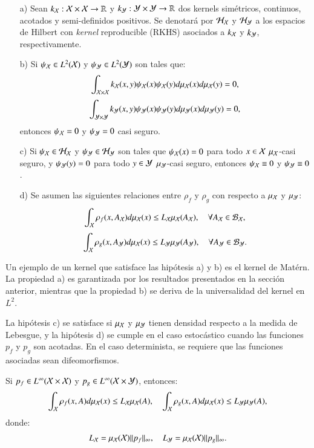 \begin{enumerate}
    \item[a)] Sean $k_{\mathcal{X}}:\mathcal{X} \times \mathcal{X} \to \mathbb{R}$ y $k_{\mathcal{Y}}: \mathcal{Y} \times \mathcal{Y} \to \mathbb{R}$ dos kernels simétricos, continuos, acotados y semi-definidos positivos. Se denotará por $\mathcal{H}_{\mathcal{X}}$ y $\mathcal{H}_{\mathcal{Y}}$ a los espacios de Hilbert con \textit{kernel} reproducible (RKHS) asociados a $k_{\mathcal{X}}$ y $k_{\mathcal{Y}}$, respectivamente.
    \item[b)] Si $\psi_{\mathcal{X}} \in L^2(\mathcal{X})$ y $\psi_{\mathcal{Y}} \in L^2(\mathcal{Y})$ son tales que: 
    \[
        \int_{\mathcal{X} \times \mathcal{X}} k_{\mathcal{X}}(x,y) \psi_{\mathcal{X}} (x) \psi_{\mathcal{X}} (y) d \mu_{\mathcal{X}} (x) d \mu_{\mathcal{X}} (y) = 0, 
    \]
    \[
        \int_{\mathcal{Y} \times \mathcal{Y}} k_{\mathcal{Y}}(x,y) \psi_{\mathcal{Y}} (x) \psi_{\mathcal{Y}} (y) d \mu_{\mathcal{Y}} (x) d \mu_{\mathcal{Y}} (y) = 0, 
    \]
    entonces $\psi_{\mathcal{X}} = 0$ y $\psi_{\mathcal{Y}} = 0$ casi seguro.
    \item[c)] Si $\psi_{\mathcal{X}} \in \mathcal{H}_{\mathcal{X}}$ y $\psi_{\mathcal{Y}} \in \mathcal{H}_{\mathcal{Y}}$ son tales que $\psi_{\mathcal{X}}(x) = 0$ para todo $x \in \mathcal{X}$ $\mu_{\mathcal{X}}$-casi seguro, y $\psi_{\mathcal{Y}}(y) = 0$ para todo $y \in \mathcal{Y}$ $\mu_{\mathcal{Y}}$-casi seguro, entonces $\psi_{\mathcal{X}} \equiv 0$ y $\psi_{\mathcal{Y}} \equiv 0$.
    \item[d)] Se asumen las siguientes relaciones entre $\rho_f$ y $\rho_g$ con respecto a $\mu_{\mathcal{X}}$ y $\mu_{\mathcal{Y}}$:
    \[
        \int_{\mathcal{X}} \rho_f (x, A_{\mathcal{X}}) d\mu_{\mathcal{X}} (x) \leq L_{\mathcal{X}} \mu_{\mathcal{X}} (A_{\mathcal{X}}), \quad \forall A_{\mathcal{X}} \in \mathcal{B}_{\mathcal{X}},
    \]
    \[
        \int_{\mathcal{X}} \rho_g (x, A_{\mathcal{Y}}) d\mu_{\mathcal{X}} (x) \leq L_{\mathcal{Y}} \mu_{\mathcal{Y}} (A_{\mathcal{Y}}), \quad \forall A_{\mathcal{Y}} \in \mathcal{B}_{\mathcal{Y}}.
    \]
\end{enumerate}

Un ejemplo de un kernel que satisface las hipótesis a) y b) es el kernel de Matérn. La propiedad a) es garantizada por los resultados presentados en la sección anterior, mientras que la propiedad b) se deriva de la universalidad del kernel en $L^2$. 

La hipótesis c) se satisface si $\mu_{\mathcal{X}}$ y $\mu_{\mathcal{Y}}$ tienen densidad respecto a la medida de Lebesgue, y la hipótesis d) se cumple en el caso estocástico cuando las funciones $p_f$ y $p_g$ son acotadas. En el caso determinista, se requiere que las funciones asociadas sean difeomorfismos.

\begin{prop}
    Si $p_f \in L^{\infty} (\mathcal{X} \times \mathcal{X})$ y $p_g \in L^{\infty} (\mathcal{X} \times \mathcal{Y})$, entonces:
    \[
        \int_{\mathcal{X}} \rho_f (x, A) d\mu_{\mathcal{X}} (x) \leq L_{\mathcal{X}} \mu_{\mathcal{X}} (A), \quad \int_{\mathcal{X}} \rho_g (x, A) d\mu_{\mathcal{X}} (x) \leq L_{\mathcal{Y}} \mu_{\mathcal{Y}} (A),
    \]
    donde:
    \[
        L_{\mathcal{X}} = \mu_{\mathcal{X}} (\mathcal{X}) \| p_f \|_\infty, \quad L_{\mathcal{Y}} = \mu_{\mathcal{X}} (\mathcal{X}) \| p_g \|_\infty.
    \]
\end{prop}


